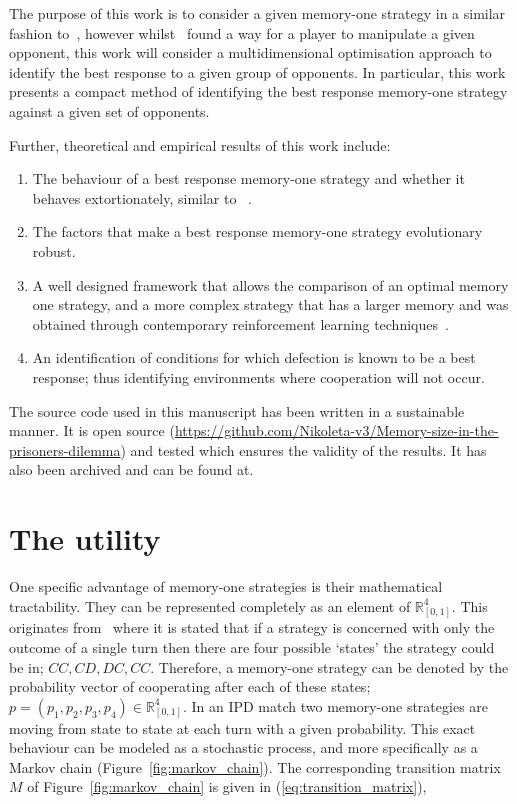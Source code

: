 \documentclass[10pt]{article}
\newcommand{\R}{\mathbb{R}}
\begin{document}
The purpose of this work is to consider a given memory-one strategy in a similar
fashion to~\cite{Press2012}, however whilst~\cite{Press2012} found a way for a
player to manipulate a given opponent, this work will consider a
multidimensional optimisation approach to identify the best response to a given
group of opponents. In particular, this work presents a compact method of
identifying the best response memory-one strategy against a given set of
opponents.

Further, theoretical and empirical results of this work include:

\begin{enumerate}
    \item The behaviour of a best response memory-one strategy and whether it
    behaves extortionately, similar to ~\cite{Press2012}.
    \item The factors that make a best response memory-one strategy evolutionary
    robust.
    \item A well designed framework that allows the comparison of an optimal
          memory one strategy, and a more complex strategy that has a larger
          memory and was obtained through contemporary reinforcement learning
          techniques~\cite{Harper2017}.
    \item An identification of conditions for which defection is known to be a
    best response; thus identifying environments where cooperation will not
    occur.
\end{enumerate}

The source code used in this manuscript has been written in a sustainable manner.
It is open source (\url{https://github.com/Nikoleta-v3/Memory-size-in-the-prisoners-dilemma})
and tested which ensures the validity of the results. It has also been archived
and can be found at.

\section{The utility}\label{section:utility}

One specific advantage of memory-one strategies is their mathematical
tractability. They can be represented completely as an element of \(\R^{4}_{[0, 1]}\). This
originates from~\cite{Nowak1989} where it is stated that if a strategy is
concerned with only the outcome of a single turn then there are four possible
`states' the strategy could be in; \(CC, CD, DC,CC\). Therefore, a memory-one
strategy can be denoted by the probability vector of cooperating after each of
these states; \(p=(p_1, p_2, p_3, p_4) \in \R_{[0,1]} ^ 4\). In an IPD match two
memory-one strategies are moving from state to state at each turn with a given
probability. This exact behaviour can be modeled as a stochastic process, and
more specifically as a Markov chain (Figure~\ref{fig:markov_chain}). The
corresponding transition matrix \(M\) of Figure~\ref{fig:markov_chain} is given
in (\ref{eq:transition_matrix}),
\end{document}
